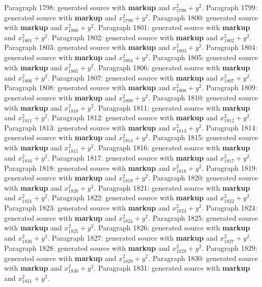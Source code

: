 \documentclass{article}
\begin{document}
Paragraph 1798: generated source with \textbf{markup} and $x_{1798}^2 + y^2$.
Paragraph 1799: generated source with \textbf{markup} and $x_{1799}^2 + y^2$.
Paragraph 1800: generated source with \textbf{markup} and $x_{1800}^2 + y^2$.
Paragraph 1801: generated source with \textbf{markup} and $x_{1801}^2 + y^2$.
Paragraph 1802: generated source with \textbf{markup} and $x_{1802}^2 + y^2$.
Paragraph 1803: generated source with \textbf{markup} and $x_{1803}^2 + y^2$.
Paragraph 1804: generated source with \textbf{markup} and $x_{1804}^2 + y^2$.
Paragraph 1805: generated source with \textbf{markup} and $x_{1805}^2 + y^2$.
Paragraph 1806: generated source with \textbf{markup} and $x_{1806}^2 + y^2$.
Paragraph 1807: generated source with \textbf{markup} and $x_{1807}^2 + y^2$.
Paragraph 1808: generated source with \textbf{markup} and $x_{1808}^2 + y^2$.
Paragraph 1809: generated source with \textbf{markup} and $x_{1809}^2 + y^2$.
Paragraph 1810: generated source with \textbf{markup} and $x_{1810}^2 + y^2$.
Paragraph 1811: generated source with \textbf{markup} and $x_{1811}^2 + y^2$.
Paragraph 1812: generated source with \textbf{markup} and $x_{1812}^2 + y^2$.
Paragraph 1813: generated source with \textbf{markup} and $x_{1813}^2 + y^2$.
Paragraph 1814: generated source with \textbf{markup} and $x_{1814}^2 + y^2$.
Paragraph 1815: generated source with \textbf{markup} and $x_{1815}^2 + y^2$.
Paragraph 1816: generated source with \textbf{markup} and $x_{1816}^2 + y^2$.
Paragraph 1817: generated source with \textbf{markup} and $x_{1817}^2 + y^2$.
Paragraph 1818: generated source with \textbf{markup} and $x_{1818}^2 + y^2$.
Paragraph 1819: generated source with \textbf{markup} and $x_{1819}^2 + y^2$.
Paragraph 1820: generated source with \textbf{markup} and $x_{1820}^2 + y^2$.
Paragraph 1821: generated source with \textbf{markup} and $x_{1821}^2 + y^2$.
Paragraph 1822: generated source with \textbf{markup} and $x_{1822}^2 + y^2$.
Paragraph 1823: generated source with \textbf{markup} and $x_{1823}^2 + y^2$.
Paragraph 1824: generated source with \textbf{markup} and $x_{1824}^2 + y^2$.
Paragraph 1825: generated source with \textbf{markup} and $x_{1825}^2 + y^2$.
Paragraph 1826: generated source with \textbf{markup} and $x_{1826}^2 + y^2$.
Paragraph 1827: generated source with \textbf{markup} and $x_{1827}^2 + y^2$.
Paragraph 1828: generated source with \textbf{markup} and $x_{1828}^2 + y^2$.
Paragraph 1829: generated source with \textbf{markup} and $x_{1829}^2 + y^2$.
Paragraph 1830: generated source with \textbf{markup} and $x_{1830}^2 + y^2$.
Paragraph 1831: generated source with \textbf{markup} and $x_{1831}^2 + y^2$.
\end{document}
